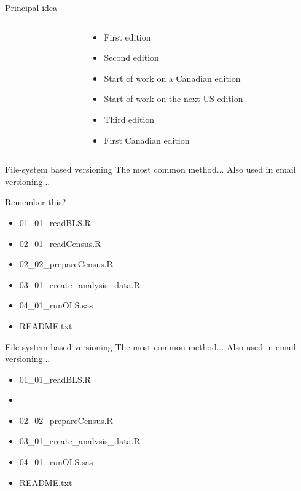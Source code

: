 \documentclass[xcolor=table,compress]{beamer}
\begin{document}
\begin{frame}{Principal idea}
\begin{columns}
\begin{column}{.48\textwidth}
\end{column}
\hfill
\begin{column}{.48\textwidth}
\begin{itemize}[<+->]
\item[1] First edition
\item[4] Second edition
\item[5] Start of work on a Canadian edition
\item[6] Start of work on the next US edition
\item[9] Third edition
\item[10] First Canadian edition
\end{itemize}
\end{column}
\end{columns}
\end{frame}



\begin{frame}[fragile]{File-system based versioning}
The most common method... Also used in email versioning...
\begin{block}{Remember this?}
\footnotesize \ttfamily
\begin{itemize}
\item[\ ] 01\_01\_readBLS.R
\item[\ ] {02\_01\_readCensus.R}
\item[\ ] 02\_02\_prepareCensus.R
\item[\ ] 03\_01\_create\_analysis\_data.R
\item[\ ] 04\_01\_runOLS.sas
\item[\ ] README.txt
\end{itemize}
\end{block}
\end{frame}



\begin{frame}[fragile]{File-system based versioning}
The most common method... Also used in email versioning...
\begin{block}{
}
\footnotesize \ttfamily
\begin{itemize}
\item[\ ] 01\_01\_readBLS.R
\item[\ ] 
\item[\ ] 02\_02\_prepareCensus.R
\item[\ ] 03\_01\_create\_analysis\_data.R
\item[\ ] 04\_01\_runOLS.sas
\item[\ ] README.txt
\end{itemize}
\end{block}
\end{frame}
\end{document}
